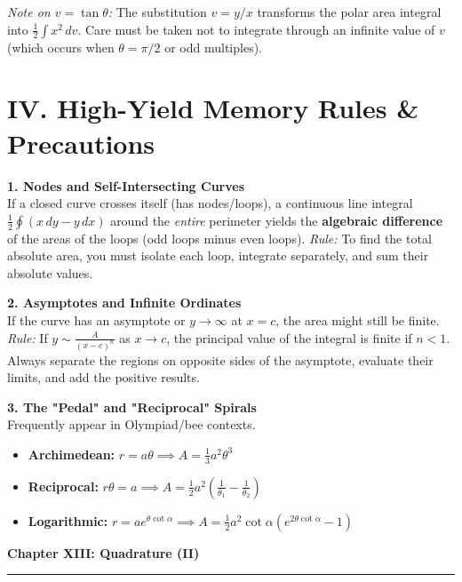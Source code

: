\documentclass[11pt, a4paper]{article}
\begin{document}
\vspace{0.2cm}

\textit{\small Note on $v = \tan \theta$:} The substitution $v = y/x$ transforms the polar area integral into $\frac{1}{2} \int x^2 \, dv$. Care must be taken not to integrate through an infinite value of $v$ (which occurs when $\theta = \pi/2$ or odd multiples).


\section*{\color{primary} IV. High-Yield Memory Rules \& Precautions}

\textbf{1. Nodes and Self-Intersecting Curves}\\
If a closed curve crosses itself (has nodes/loops), a continuous line integral $\frac{1}{2} \oint (x \, dy - y \, dx)$ around the \textit{entire} perimeter yields the \textbf{algebraic difference} of the areas of the loops (odd loops minus even loops). 
\textit{Rule:} To find the total absolute area, you must isolate each loop, integrate separately, and sum their absolute values.

\textbf{2. Asymptotes and Infinite Ordinates}\\
If the curve has an asymptote or $y \to \infty$ at $x=c$, the area might still be finite. 
\textit{Rule:} If $y \sim \frac{A}{(x-c)^n}$ as $x \to c$, the principal value of the integral is finite if $n < 1$. Always separate the regions on opposite sides of the asymptote, evaluate their limits, and add the positive results.

\textbf{3. The "Pedal" and "Reciprocal" Spirals}\\
Frequently appear in Olympiad/bee contexts. 
\begin{itemize}[leftmargin=*, nosep]
    \item \textbf{\color{accent}Archimedean:} $r = a\theta \implies A = \frac{1}{3} a^2 \theta^3$
    \item \textbf{\color{accent}Reciprocal:} $r\theta = a \implies A = \frac{1}{2} a^2 \left(\frac{1}{\theta_1} - \frac{1}{\theta_2}\right)$
    \item \textbf{\color{accent}Logarithmic:} $r = a e^{\theta \cot \alpha} \implies A = \frac{1}{2} a^2 \cot \alpha (e^{2\theta \cot \alpha} - 1)$
\end{itemize}

\newpage

\begin{center}
    {\LARGE \bfseries \color{accent} Chapter XIII: Quadrature (II)}\\
    \vspace{0.2cm}
    {\color{accent}\rule{0.55\linewidth}{0.8pt}}
\end{center}
\vspace{0.35cm}
\end{document}
